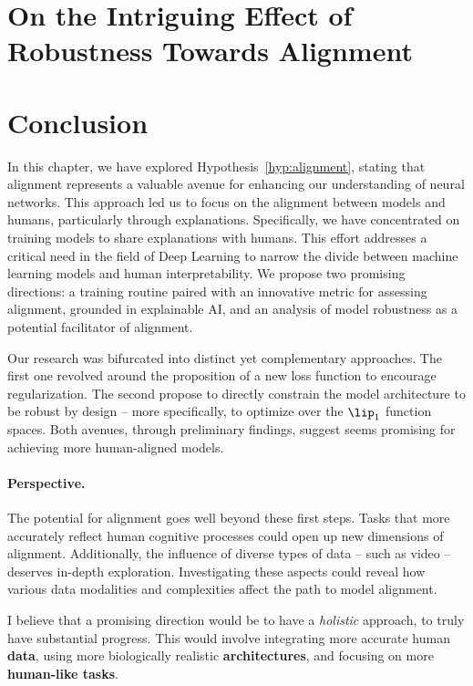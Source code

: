 \section{On the Intriguing Effect of Robustness Towards Alignment}
\label{sec:lipschitz}

\clearpage

\section{Conclusion}

In this chapter, we have explored Hypothesis~\ref{hyp:alignment}, stating that alignment represents a valuable avenue for enhancing our understanding of neural networks. This approach led us to focus on the alignment between models and humans, particularly through explanations. Specifically, we have concentrated on training models to share explanations with humans. This effort addresses a critical need in the field of Deep Learning to narrow the divide between machine learning models and human interpretability. We propose two promising directions: a training routine paired with an innovative metric for assessing alignment, grounded in explainable AI, and an analysis of model robustness as a potential facilitator of alignment.

Our research was bifurcated into distinct yet complementary approaches. The first one revolved around the proposition of a new loss function to encourage regularization. The second propose to directly constrain the model architecture to be robust by design -- more specifically, to optimize over the $\lip_1$ function spaces. Both avenues, through preliminary findings, suggest seems promising for achieving more human-aligned models.

\paragraph{Perspective.} The potential for alignment goes well beyond these first steps. Tasks that more accurately reflect human cognitive processes could open up new dimensions of alignment. Additionally, the influence of diverse types of data -- such as video -- deserves in-depth exploration. Investigating these aspects could reveal how various data modalities and complexities affect the path to model alignment.

I believe that a promising direction would be to have a \textit{holistic} approach, to truly have substantial progress. This would involve integrating more accurate human \textbf{data}, using more biologically realistic \textbf{architectures}, and focusing on more \textbf{human-like tasks}.

